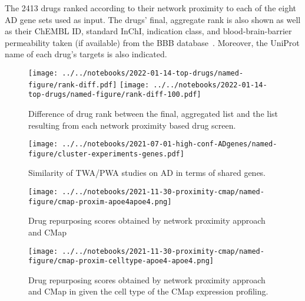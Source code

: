 \documentclass[letterpaper]{article}
\begin{document}
\begin{table}[p]
\caption{
  The 2413 drugs ranked according to their network proximity to each of the eight
  AD gene sets used as input.  The drugs' final, aggregate rank is also shown
  as well as their ChEMBL ID, standard InChI, indication class, and
  blood-brain-barrier permeability taken (if available) from the BBB
  database~\citep{Meng2021}.  Moreover, the UniProt name of each drug's
  targets is also indicated.
}
\label{tab:ranked-drugs}
\end{table}

\begin{figure}[p]
\texttt{[image: ../../notebooks/2022-01-14-top-drugs/named-figure/rank-diff.pdf]}
\texttt{[image: ../../notebooks/2022-01-14-top-drugs/named-figure/rank-diff-100.pdf]}
\caption{
Difference of drug rank between the final, aggregated list and the list
resulting from each network proximity based drug screen.
}
\label{fig:rank-diff}
\end{figure}


\begin{figure}
\texttt{[image: ../../notebooks/2021-07-01-high-conf-ADgenes/named-figure/cluster-experiments-genes.pdf]}
\caption{
Similarity of TWA/PWA studies on AD in terms of shared genes.
}
\label{fig:twas-clustermap}
\end{figure}

\begin{figure}[p]
\texttt{[image: ../../notebooks/2021-11-30-proximity-cmap/named-figure/cmap-proxim-apoe4apoe4.png]}
\caption{
Drug repurposing scores obtained by network proximity approach and CMap
}
\label{fig:proxim-cmap}
\end{figure}

\begin{figure}[p]
\texttt{[image: ../../notebooks/2021-11-30-proximity-cmap/named-figure/cmap-proxim-celltype-apoe4-apoe4.png]}
\caption{
Drug repurposing scores obtained by network proximity approach and CMap in
given the cell type of the CMap expression profiling.
}
\label{fig:proxim-cmap-celltype}
\end{figure}
\end{document}
